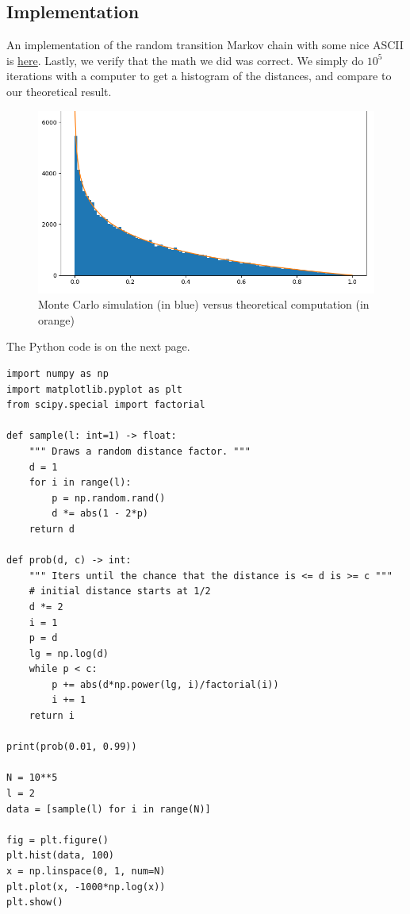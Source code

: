 \documentclass[11pt, oneside]{article}
\begin{document}
\subsection{Implementation}

An implementation of the random transition Markov chain with some nice ASCII is
\href{https://github.com/qmk/qmk_firmware/blob/master/keyboards/dm9records/plaid/keymaps/stephen-huan/keymap.c}{here}.
Lastly, we verify that the math we did was correct. We simply do \( 10^5 \)
iterations with a computer to get a histogram of the distances, and compare
to our theoretical result.

\begin{figure}[h!]
  \centering
  \includegraphics[scale=0.6]{graph}
  \caption{Monte Carlo simulation (in blue) versus
  theoretical computation (in orange)}
\end{figure}

The Python code is on the next page.

\begin{verbatim}
import numpy as np
import matplotlib.pyplot as plt
from scipy.special import factorial

def sample(l: int=1) -> float:
    """ Draws a random distance factor. """
    d = 1
    for i in range(l):
        p = np.random.rand()
        d *= abs(1 - 2*p)
    return d

def prob(d, c) -> int:
    """ Iters until the chance that the distance is <= d is >= c """
    # initial distance starts at 1/2
    d *= 2
    i = 1
    p = d
    lg = np.log(d)
    while p < c:
        p += abs(d*np.power(lg, i)/factorial(i))
        i += 1
    return i

print(prob(0.01, 0.99))

N = 10**5
l = 2
data = [sample(l) for i in range(N)]

fig = plt.figure()
plt.hist(data, 100)
x = np.linspace(0, 1, num=N)
plt.plot(x, -1000*np.log(x))
plt.show()
\end{verbatim}

\end{document}
